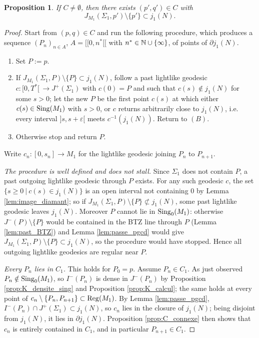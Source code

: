 \documentclass[a4paper,twoside]{article}
\providecommand{\lsem}{[\![}
\newtheorem{prop}[lem]{Proposition}
\begin{document}
\begin{prop}\label{prop:Cauchy_point_min}
If $C\neq \emptyset$, then there exists $(p',q')\in C$ with
$$J_{M_1}(\Sigma_1,p')\setminus\{p'\}\subset j_1(N).$$
\end{prop}
\begin{proof}
Start from $(p,q)\in C$ and run the following procedure, which produces a sequence $(P_n)_{n\in A}$,
$A=\lsem 0,n^*\lsem$ with $n^*\in \mathbb{N}\cup\{\infty\}$, of points of $\partial j_1(N)$.
\begin{enumerate}[label=(\Alph*)]
\item Set $P:=p$.
\item If $J_{M_1}(\Sigma_1,P)\setminus\{P\}\subset j_1(N)$, follow a past lightlike geodesic
$c:[0,T^*[\,\rightarrow J^+(\Sigma_1)$ with $c(0)=P$ and such that $c(s)\notin j_1(N)$ for some
$s>0$; let the new $P$ be the first point $c(s)$ at which either $c(s)\in \mathrm{Sing}(M_1)$ with $s>0$, or
$c$ returns arbitrarily close to $j_1(N)$, i.e. every interval $]s,s+\varepsilon[$ meets
$c^{-1}(j_1(N))$. Return to $(B)$.
\item Otherwise stop and return $P$.
\end{enumerate}
Write $c_n:[0,s_n]\rightarrow M_1$ for the lightlike geodesic joining $P_n$ to $P_{n+1}$.

\emph{The procedure is well defined and does not stall.} Since $\Sigma_1$ does not contain $P$, a
past outgoing lightlike geodesic through $P$ exists. For any such geodesic $c$, the set $\{s\geq
0~|~c(s)\in j_1(N)\}$ is an open interval not containing $0$ by Lemma \ref{lem:image_diamant}; so if
$J_{M_1}(\Sigma_1,P)\setminus\{P\}\not\subset j_1(N)$, some past lightlike geodesic leaves
$j_1(N)$. Moreover $P$ cannot lie in $\mathrm{Sing}_0(M_1)$: otherwise $J^-(P)\setminus\{P\}$ would be
contained in the BTZ line through $P$ (Lemma \ref{lem:past_BTZ}) and Lemma \ref{lem:passe_pgcd}
would give $J_{M_1}(\Sigma_1,P)\setminus\{P\}\subset j_1(N)$, so the procedure would have stopped.
Hence all outgoing lightlike geodesics are regular near $P$.

\emph{Every $P_n$ lies in $C_1$.} This holds for $P_0=p$. Assume $P_n\in C_1$. As just observed
$P_n\notin \mathrm{Sing}_0(M_1)$, so $I^-(P_n)$ is dense in $J^-(P_n)$ by Proposition
\ref{prop:K_densite_sing} and Proposition \ref{prop:K_calcul}; the same holds at every point of
$c_n\setminus\{P_n,P_{n+1}\}\subset \mathrm{Reg}(M_1)$. By Lemma \ref{lem:passe_pgcd},
$I^-(P_n)\cap J^+(\Sigma_1)\subset j_1(N)$, so $c_n$ lies in the closure of $j_1(N)$; being disjoint
from $j_1(N)$, it lies in $\partial j_1(N)$. Proposition \ref{prop:C_connexe} then shows that $c_n$
is entirely contained in $C_1$, and in particular $P_{n+1}\in C_1$.


\end{proof}
\end{document}

